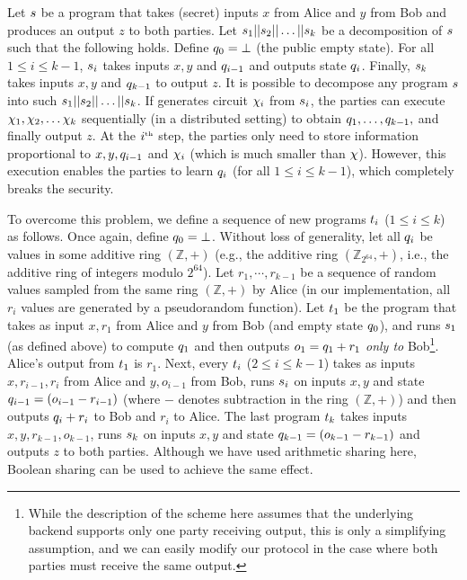 Let $s$ be a program that takes (secret) inputs $x$ from Alice and
$y$ from Bob and produces an output $z$ to both parties. Let
$s_1||s_2||\dots||s_k$ be a decomposition of $s$
such that the following holds. Define $q_0 = \bot$ (the public empty
state). For all
$1\leq i\leq k-1$, $s_i$ takes inputs $x, y$ and $q_{i-1}$ and
outputs state $q_i$. Finally, $s_k$ takes inputs $x, y$ and
$q_{k-1}$ to  output $z$. It is
possible to decompose any program $s$  into such
$s_1||s_2||\dots||s_k$. If \tool generates circuit
$\chi_i$ from
$s_i$, the parties can execute
$\chi_1, \chi_2, \dots \chi_k$
sequentially (in a distributed setting)  to obtain
$q_1,\dots,q_{k-1},$ and finally output $z$. At the
$i^{\textrm{\tiny{th}}}$ step, the parties only need to store
information proportional to $x,y,q_{i-1}$ and $\chi_i$ (which is
much smaller than $\chi$). However, this execution enables the
parties to learn $q_i$ (for all $1\leq i\leq k-1$), which
completely breaks the security.

To overcome this problem, we define a sequence of new programs
$t_i$ ($1\leq i\leq k$) as follows. Once again, define $q_0
= \bot$. Without
loss of generality, let all $q_i$ be values in some additive ring
$(\mathbb{Z},+)$ (e.g., the additive ring $(\mathbb{Z}_{2^{64}},+)$,
i.e., the additive ring of integers modulo $2^{64}$).
Let $r_1,\cdots,r_{k-1}$ be a sequence of random values sampled from
the same ring $(\mathbb{Z},+)$ by Alice (in our implementation, all
$r_i$ values are generated by a pseudorandom function). Let $t_1$
be the program that takes as input $x,r_1$ from Alice and $y$ from Bob
(and empty state $q_0$), and runs $s_1$ (as defined above) to
compute $q_1$ and then outputs $o_1 = q_1 + r_1$ {\em only
  to} Bob\footnote{While the description of the scheme here assumes
  that
  the underlying backend supports only one party receiving output,
  this is only a simplifying assumption, and we can easily modify our
  protocol in the case where both parties must receive the same
  output. %
 }. 
  Alice's output
from $t_1$ is $r_1$. Next, every $t_i$ ($2\leq i\leq k-1$)
takes as inputs $x,r_{i-1},r_i$ from Alice and $y,o_{i-1}$ from Bob,
runs $s_i$
on inputs $x,y$ and state $q_{i-1} = (o_{i-1}-r_{i-1})$ (where $-$ denotes
subtraction in the ring $(\mathbb{Z},+)$) and then outputs $q_i+r_i$
to Bob and $r_i$ to Alice. The last
program $t_k$ takes inputs $x,y,r_{k-1},o_{k-1}$, runs $s_k$
on inputs $x,y$ and state $q_{k-1} = (o_{k-1}-r_{k-1})$ and outputs $z$ to both
parties. Although we have used arithmetic sharing here, Boolean sharing can be used to achieve the same effect.

